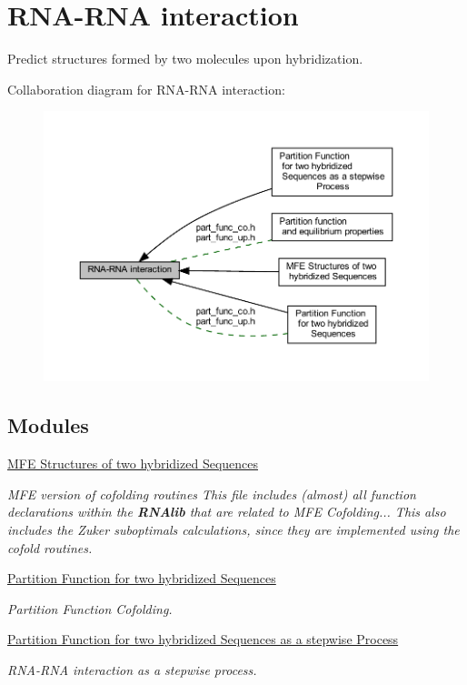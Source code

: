 \hypertarget{group__cofold}{}\section{R\+N\+A-\/\+R\+NA interaction}
\label{group__cofold}


Predict structures formed by two molecules upon hybridization.  


Collaboration diagram for R\+N\+A-\/\+R\+NA interaction\+:
\nopagebreak
\begin{figure}[H]
\begin{center}
\leavevmode
\includegraphics[width=350pt]{group__cofold}
\end{center}
\end{figure}
\subsection*{Modules}
\begin{DoxyCompactItemize}
\item 
\hyperlink{group__mfe__cofold}{M\+F\+E Structures of two hybridized Sequences}
\begin{DoxyCompactList}\small\item\em M\+FE version of cofolding routines This file includes (almost) all function declarations within the {\bfseries R\+N\+Alib} that are related to M\+FE Cofolding... This also includes the Zuker suboptimals calculations, since they are implemented using the cofold routines. \end{DoxyCompactList}\item 
\hyperlink{group__pf__cofold}{Partition Function for two hybridized Sequences}
\begin{DoxyCompactList}\small\item\em Partition Function Cofolding. \end{DoxyCompactList}\item 
\hyperlink{group__up__cofold}{Partition Function for two hybridized Sequences as a stepwise Process}
\begin{DoxyCompactList}\small\item\em R\+N\+A-\/\+R\+NA interaction as a stepwise process. \end{DoxyCompactList}\end{DoxyCompactItemize}
